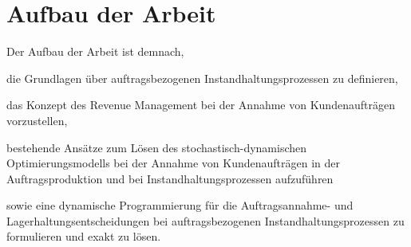 \section{Aufbau der Arbeit}

Der Aufbau der Arbeit ist demnach,

die Grundlagen über auftragsbezogenen Instandhaltungsprozessen zu definieren,

das Konzept des Revenue Management bei der Annahme von Kundenaufträgen vorzustellen,

bestehende Ansätze zum Lösen des stochastisch-dynamischen Optimierungsmodells bei der Annahme von Kundenaufträgen in der Auftragsproduktion und bei Instandhaltungsprozessen aufzuführen

sowie eine dynamische Programmierung für die Auftragsannahme- und Lagerhaltungsentscheidungen bei auftragsbezogenen Instandhaltungsprozessen zu formulieren und exakt zu lösen.